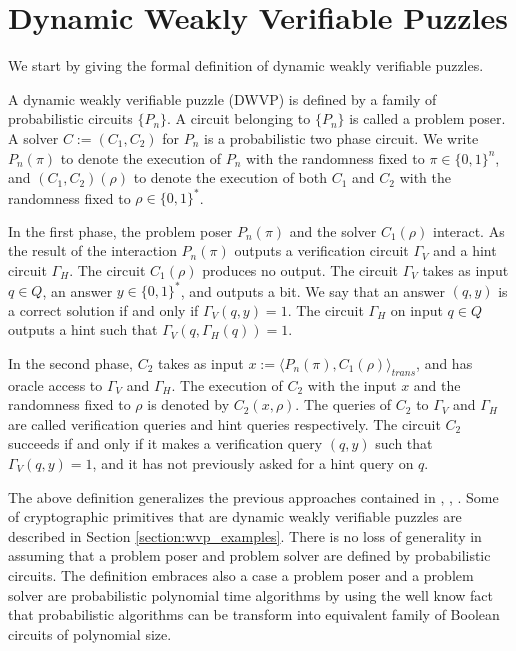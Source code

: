 \documentclass[11pt,a4paper,titlepage]{memoir}
\begin{document}
\section{Dynamic Weakly Verifiable Puzzles}
\label{section:wvp}
We start by giving the formal definition of dynamic weakly verifiable puzzles.
\begin{definition}
  \label{def:dwvp}
  A dynamic weakly verifiable puzzle (DWVP) is defined by a family of probabilistic circuits $\{P_n\}$.
  A circuit belonging to $\{P_n\}$ is called a problem poser.
  A solver $C := (C_1, C_2)$ for $P_n$ is a probabilistic two phase circuit.
  We write $P_n(\pi)$ to denote the execution of $P_n$ with the randomness fixed to $\pi \in \{0,1\}^n$, and $(C_1,C_2)(\rho)$
  to denote the execution of both $C_1$ and $C_2$ with the randomness fixed to $\rho \in \{0,1\}^{*}$.

  In the first phase, the problem poser $P_n(\pi)$ and the solver $C_1(\rho)$ interact.
  As the result of the interaction $P_n(\pi)$ outputs a verification circuit $\Gamma_{V}$ and a hint circuit $\Gamma_{H}$.
  The circuit $C_1(\rho)$ produces no output.
  The circuit $\Gamma_{V}$ takes as input $q \in Q$, an answer $y \in \{0,1\}^*$,
  and outputs a bit. We say that an answer $(q,y)$ is a correct solution if and only if $\Gamma_V(q,y) = 1$.
  The circuit $\Gamma_H$ on input $q \in Q$ outputs a hint such that $\Gamma_V(q,\Gamma_H(q)) = 1$.

  In the second phase, $C_2$ takes as input $x := \langle P_n(\pi), C_1(\rho) \rangle_{\mathit{trans}}$,
  and has oracle access to $\Gamma_V$ and $\Gamma_H$.
  The execution of $C_2$ with the input $x$ and the randomness fixed to $\rho$
  is denoted by $C_2(x, \rho)$. The queries of $C_2$ to $\Gamma_V$ and $\Gamma_H$ are called verification queries and hint queries respectively.
  The circuit $C_2$ succeeds if and only if it makes a verification query $(q,y)$ such that $\Gamma_V(q,y) = 1$,
  and it has not previously asked for a hint query on $q$.
\end{definition}

The above definition generalizes the previous approaches contained in \cite{canetti2004hardness}, \cite{Dodis:2009:SAI:1530441.1530450}, \cite{DBLP:journals/corr/abs-1002-3534}.
Some of cryptographic primitives that are dynamic weakly verifiable puzzles are described in Section \ref{section:wvp_examples}.
There is no loss of generality in assuming that a problem poser and problem solver are defined by probabilistic circuits.
The definition embraces also a case a problem poser and a problem solver are probabilistic polynomial time algorithms
by using the well know fact \cite{LectureNotesCT} that probabilistic algorithms can be transform into equivalent family of Boolean circuits of polynomial size.
\end{document}
